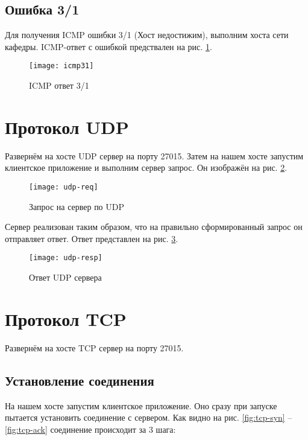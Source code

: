\subsection{Ошибка 3/1}

Для получения ICMP ошибки 3/1 (Хост недостижим), выполним  хоста  сети кафедры. ICMP-ответ с ошибкой предствален на рис. \ref{fig:icmp31}.

\begin{figure}[H]
	\centering
	\texttt{[image: icmp31]}
	\caption{ICMP ответ 3/1}
	\label{fig:icmp31}
\end{figure}

\newpage

\section{Протокол UDP}

Развернём на хосте  UDP сервер на порту 27015. Затем на нашем хосте  запустим клиентское приложение и выполним сервер запрос. Он изображён на рис. \ref{fig:udp-req}.

\begin{figure}[H]
	\centering
	\texttt{[image: udp-req]}
	\caption{Запрос на сервер по UDP}
	\label{fig:udp-req}
\end{figure}

Сервер реализован таким образом, что на правильно сформированный запрос он отправляет ответ. Ответ представлен на рис. \ref{fig:udp-resp}.

\begin{figure}[H]
	\centering
	\texttt{[image: udp-resp]}
	\caption{Ответ UDP сервера}
	\label{fig:udp-resp}
\end{figure}

\section{Протокол TCP}

Развернём на хосте  TCP сервер на порту 27015. 

\subsection{Установление соединения}

На нашем хосте  запустим клиентское приложение. Оно сразу при запуске пытается установить соединение с сервером. Как видно на рис. \ref{fig:tcp-syn} -- \ref{fig:tcp-ack} соединение происходит за 3 шага:

